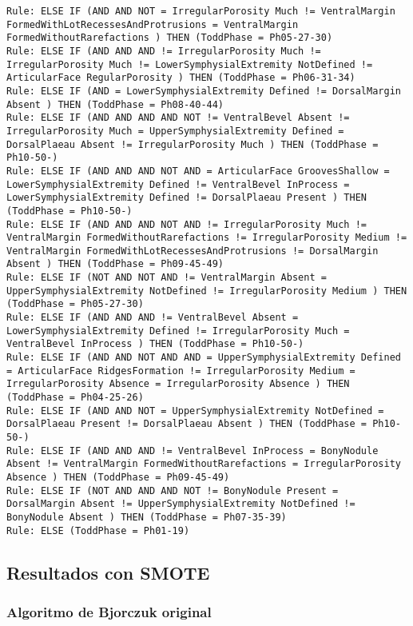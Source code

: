 \begin{lstlisting}
Rule: ELSE IF (AND AND NOT = IrregularPorosity Much != VentralMargin FormedWithLotRecessesAndProtrusions = VentralMargin FormedWithoutRarefactions ) THEN (ToddPhase = Ph05-27-30)
Rule: ELSE IF (AND AND AND != IrregularPorosity Much != IrregularPorosity Much != LowerSymphysialExtremity NotDefined != ArticularFace RegularPorosity ) THEN (ToddPhase = Ph06-31-34)
Rule: ELSE IF (AND = LowerSymphysialExtremity Defined != DorsalMargin Absent ) THEN (ToddPhase = Ph08-40-44)
Rule: ELSE IF (AND AND AND AND NOT != VentralBevel Absent != IrregularPorosity Much = UpperSymphysialExtremity Defined = DorsalPlaeau Absent != IrregularPorosity Much ) THEN (ToddPhase = Ph10-50-)
Rule: ELSE IF (AND AND AND NOT AND = ArticularFace GroovesShallow = LowerSymphysialExtremity Defined != VentralBevel InProcess = LowerSymphysialExtremity Defined != DorsalPlaeau Present ) THEN (ToddPhase = Ph10-50-)
Rule: ELSE IF (AND AND AND NOT AND != IrregularPorosity Much != VentralMargin FormedWithoutRarefactions != IrregularPorosity Medium != VentralMargin FormedWithLotRecessesAndProtrusions != DorsalMargin Absent ) THEN (ToddPhase = Ph09-45-49)
Rule: ELSE IF (NOT AND NOT AND != VentralMargin Absent = UpperSymphysialExtremity NotDefined != IrregularPorosity Medium ) THEN (ToddPhase = Ph05-27-30)
Rule: ELSE IF (AND AND AND != VentralBevel Absent = LowerSymphysialExtremity Defined != IrregularPorosity Much = VentralBevel InProcess ) THEN (ToddPhase = Ph10-50-)
Rule: ELSE IF (AND AND NOT AND AND = UpperSymphysialExtremity Defined = ArticularFace RidgesFormation != IrregularPorosity Medium = IrregularPorosity Absence = IrregularPorosity Absence ) THEN (ToddPhase = Ph04-25-26)
Rule: ELSE IF (AND AND NOT = UpperSymphysialExtremity NotDefined = DorsalPlaeau Present != DorsalPlaeau Absent ) THEN (ToddPhase = Ph10-50-)
Rule: ELSE IF (AND AND AND != VentralBevel InProcess = BonyNodule Absent != VentralMargin FormedWithoutRarefactions = IrregularPorosity Absence ) THEN (ToddPhase = Ph09-45-49)
Rule: ELSE IF (NOT AND AND AND NOT != BonyNodule Present = DorsalMargin Absent != UpperSymphysialExtremity NotDefined != BonyNodule Absent ) THEN (ToddPhase = Ph07-35-39)
Rule: ELSE (ToddPhase = Ph01-19)
\end{lstlisting}

\subsection{Resultados con SMOTE}

\subsubsection{Algoritmo de Bjorczuk original}


